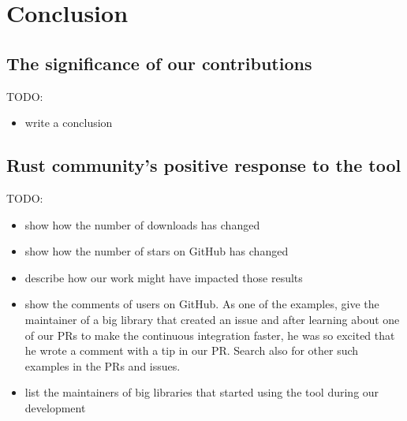 \documentclass[licencjacka,en]{pracamgr}
\begin{document}
\chapter{Conclusion}\label{r:chapter_conclusion}

\section{The significance of our contributions}\label{r:section_significance_of_contributions}

TODO:
\begin{itemize}
	\item write a conclusion
\end{itemize}

\section{Rust community's positive response to the tool}\label{r:section_community_response}

TODO:
\begin{itemize}
	\item show how the number of downloads has changed
	\item show how the number of stars on GitHub has changed
	\item describe how our work might have impacted those results
	\item show the comments of users on GitHub.
		As one of the examples, give the maintainer of a big
		library that created an issue 
		and after learning about one of our PRs to make the continuous integration faster,
		he was so excited that he wrote a comment with a tip in our PR.
		Search also for other such examples in the PRs and issues.
	\item list the maintainers of big libraries that started using the tool during our development
\end{itemize}


\appendix
\end{document}
